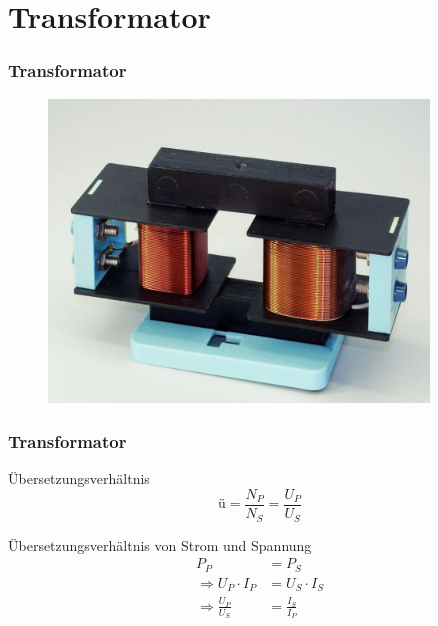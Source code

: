 \section*{Transformator}
\begin{frame}
  \frametitle{Transformator}
  \begin{center}
    \begin{figure}
      \includegraphics[width=0.9\textwidth,height=.75\textheight,keepaspectratio]{a03/trafo-Real.jpg}
    \end{figure}
  \end{center}
\end{frame}

\begin{frame}
  \frametitle{Transformator}
  \begin{block}{Übersetzungsverhältnis}
    $$\text{\"u} = \frac{N_P}{N_S} = \frac{U_P}{U_S} $$
  \end{block}
  \vspace{2em}
  \begin{block}{Übersetzungsverhältnis von Strom und Spannung}
    \begin{align*}
      P_P &= P_S\\
      \Rightarrow U_{P} \cdot I_P &= U_{S} \cdot I_S\\
      \Rightarrow \frac{U_P}{U_S} &= \frac{I_S}{I_P}
    \end{align*}
  \end{block}
\end{frame}


